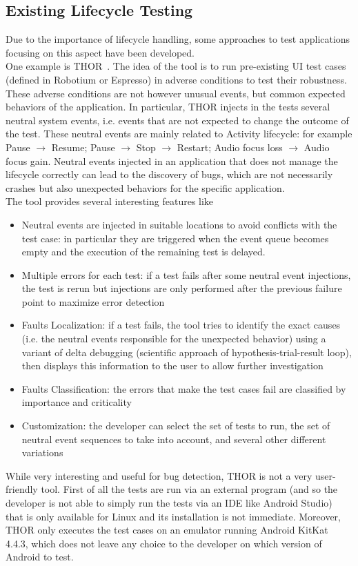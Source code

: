 \documentclass[11pt,a4paper,notitlepage]{article}
\begin{document}
\subsection{Existing Lifecycle Testing}
Due to the importance of lifecycle handling, some approaches to test applications focusing on this aspect have been developed.\smallskip \\
One example is THOR~\cite{Adamsen:2015:SEA:2771783.2771786}. The idea of the tool is to run pre-existing UI test cases (defined in Robotium or Espresso) in adverse conditions to test their robustness. These adverse conditions are not however unusual events, but common expected behaviors of the application. In particular, THOR injects in the tests several neutral system events, i.e. events that are not expected to change the outcome of the test. These neutral events are mainly related to Activity lifecycle: for example Pause $\rightarrow$ Resume; Pause $\rightarrow$ Stop $\rightarrow$ Restart; Audio
focus loss $\rightarrow$ Audio focus gain. Neutral events injected in an application that does not manage the lifecycle correctly can lead to the discovery of bugs, which are not necessarily crashes but also unexpected behaviors for the specific application.\smallskip \\
The tool provides several interesting features like
\begin{itemize}
	\item Neutral events are injected in suitable locations to avoid conflicts with the test case: in particular they are triggered when the event queue becomes empty and the execution of the remaining test is delayed.
	\item Multiple errors for each test: if a test fails after some neutral event injections, the test is rerun but injections are only performed after the previous failure point to maximize error detection
	\item Faults Localization: if a test fails, the tool tries to identify the exact causes (i.e. the neutral events responsible for the unexpected behavior) using a variant of delta debugging (scientific approach of hypothesis-trial-result loop), then displays this information to the user to allow further investigation
	\item Faults Classification: the errors that make the test cases fail are classified by importance and criticality
	\item Customization: the developer can select the set of tests to run,
the set of neutral event sequences to take into account, and
several other different variations
\end{itemize}
While very interesting and useful for bug detection, THOR is not a very user-friendly tool. First of all the tests are run via an external program (and so the developer is not able to simply run the tests via an IDE like Android Studio) that is only available for Linux and its installation is not immediate. Moreover, THOR only executes the test cases on an emulator running Android KitKat 4.4.3, which does not leave any choice to the developer on which version of Android to test.
\end{document}
